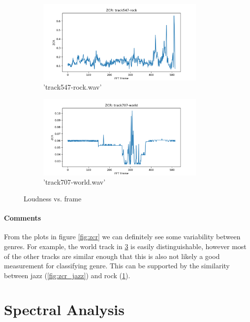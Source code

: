 \documentclass[11pt,a4paper]{article}
\begin{document}
\begin{figure}[tb]\ContinuedFloat
	\begin{subfigure}[t]{\hsize}
		\centering
		\includegraphics[width=0.9\textwidth]{zcr_track547-rock}
		\caption{'track547-rock.wav'}
		\label{fig:zcr_rock}
	\end{subfigure}
	\begin{subfigure}[t]{\hsize}
		\centering
		\includegraphics[width=0.9\textwidth]{zcr_track707-world}
		\caption{'track707-world.wav'}
		\label{fig:zcr_world}
	\end{subfigure}
	\caption{Loudness vs. frame}
\end{figure}
\clearpage

\paragraph{Comments} From the plots in figure \ref{fig:zcr} we can definitely see some variability between genres. For example, the world track in \ref{fig:zcr_world} is easily distinguishable, however most of the other tracks are similar enough that this is also not likely a good measurement for classifying genre. This can be supported by the similarity between jazz (\ref{fig:zcr_jazz}) and rock (\ref{fig:zcr_rock}).

\section{Spectral Analysis}
\end{document}
